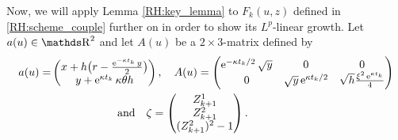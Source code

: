 Now, we will apply Lemma \ref{RH:key_lemma} to $F_k(u,z)$ defined in \eqref{RH:scheme_couple} further on in order to show its $L^p$-linear growth. Let $a(u) \in \R^2$ and let $A(u)$ be a $2 \times 3$-matrix defined by
\begin{equation*}
	\begin{aligned}
		a(u) = &
		\begin{pmatrix}
			x + h \big(r - \frac{\operatorname{e}^{- \kappa t_k} y}{2} \big) \\
			y + \operatorname{e}^{\kappa t_k} \kappa \theta h                \\
		\end{pmatrix},
		\quad A(u) =
		\begin{pmatrix}
			\operatorname{e}^{-\kappa t_k / 2} \sqrt{y} & 0                            & 0                                        \\
			0                             & \sqrt{y} \operatorname{e}^{\kappa t_k / 2} & \sqrt{h} \frac{\xi^2 \operatorname{e}^{\kappa t_k}}{4} \\
		\end{pmatrix}                             \\
		       & \qquad \qquad \qquad \mbox{and} \quad \zeta =
		\begin{pmatrix}
			Z_{k+1}^1         \\
			Z_{k+1}^2         \\
			(Z_{k+1}^2)^2 - 1 \\
		\end{pmatrix}.
	\end{aligned}
\end{equation*}

